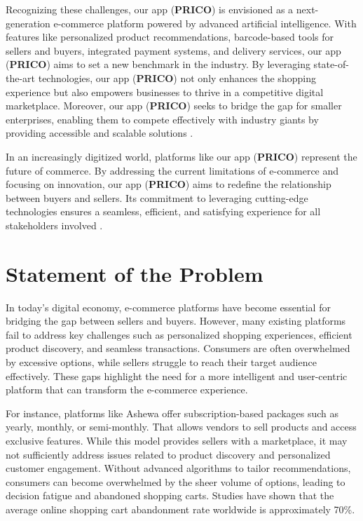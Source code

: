 \documentclass[12pt]{report}
\begin{document}
Recognizing these challenges, our app (\textbf{PRICO}) is envisioned as a next-generation
e-commerce platform powered by advanced artificial intelligence. With features like
personalized product recommendations, barcode-based tools for sellers and buyers, integrated
payment systems, and delivery services, our app (\textbf{PRICO}) aims to set a new benchmark in
the industry. By leveraging state-of-the-art technologies, our app (\textbf{PRICO}) not only enhances
the shopping experience but also empowers businesses to thrive in a competitive digital
marketplace. Moreover, our app (\textbf{PRICO}) seeks to bridge the gap for smaller enterprises,
enabling them to compete effectively with industry giants by providing accessible and
scalable solutions \cite{c1}\cite{c4}.

In an increasingly digitized world, platforms like our app (\textbf{PRICO}) represent the future of
commerce. By addressing the current limitations of e-commerce and focusing on innovation,
our app (\textbf{PRICO}) aims to redefine the relationship between buyers and sellers. Its
commitment to leveraging cutting-edge technologies ensures a seamless, efficient, and
satisfying experience for all stakeholders involved \cite{c2}\cite{c5}.

\section{Statement of the Problem}

In today's digital economy, e-commerce platforms have become essential for bridging the gap
between sellers and buyers. However, many existing platforms fail to address key challenges
such as personalized shopping experiences, efficient product discovery, and seamless
transactions. Consumers are often overwhelmed by excessive options, while sellers struggle
to reach their target audience effectively. These gaps highlight the need for a more intelligent
and user-centric platform that can transform the e-commerce experience.

For instance, platforms like Ashewa offer subscription-based packages such as yearly,
monthly, or semi-monthly. That allows vendors to sell products and access exclusive features.
While this model provides sellers with a marketplace, it may not sufficiently address issues
related to product discovery and personalized customer engagement. Without advanced
algorithms to tailor recommendations, consumers can become overwhelmed by the sheer
volume of options, leading to decision fatigue and abandoned shopping carts. Studies have
shown that the average online shopping cart abandonment rate worldwide is approximately
70\%\cite{c6}.
\end{document}
